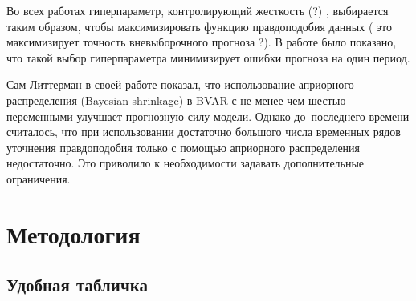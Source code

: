 \documentclass[11pt]{article} %
\begin{document}
Во всех работах гиперпараметр, контролирующий жесткость (?) , выбирается таким образом, чтобы максимизировать функцию правдоподобия  данных ( это максимизирует точность вневыборочного прогноза ?). В работе \cite{geweke_whiteman_2006_bayesian} было показано, что такой выбор гиперпараметра минимизирует ошибки прогноза на один период.


Сам Литтерман в своей работе показал, что использование априорного распределения (Bayesian shrinkage) в BVAR с  не менее  чем шестью переменными  улучшает прогнозную силу модели. Однако до~последнего времени считалось, что при использовании достаточно большого числа временных рядов уточнения правдоподобия только с помощью априорного распределения недостаточно.  Это приводило к необходимости задавать дополнительные ограничения.

\section{Методология}




\subsection{Удобная табличка}
\end{document}
